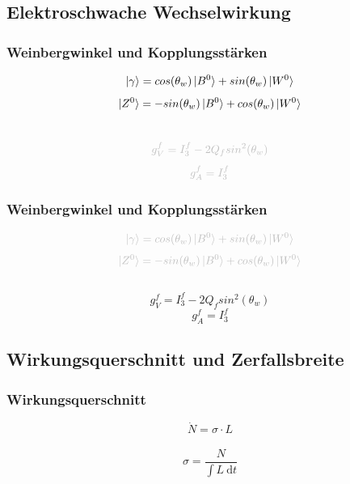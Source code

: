\subsection{Elektroschwache Wechselwirkung}
\begin{frame}
	\frametitle{Weinbergwinkel und Kopplungsstärken}
	\begin{center}
		\begin{equation*}
			\ket{\gamma} =  cos(\theta_w)\ket{B^0} + sin(\theta_w) \ket{W^0}
		\end{equation*}
		\begin{equation*}
		\ket{Z^0} = -sin(\theta_w) \ket{B^0} + cos(\theta_w) \ket{W^0}
		\end{equation*}\\
		\begin{equation*}
		\textcolor{lightgray}{g_V^f = I^f_3-2 Q_f sin^2(\theta_w)}
		\end{equation*}
		\begin{equation*}
		\textcolor{lightgray}{g_A^f = I^f_3}
		\end{equation*}
	\end{center}
\end{frame}
\begin{frame}
	\frametitle{Weinbergwinkel und Kopplungsstärken}
	\begin{center}
		\begin{equation*}
		\textcolor{lightgray}{\ket{\gamma} =  cos(\theta_w)\ket{B^0} + sin(\theta_w) \ket{W^0}}
		\end{equation*}
		\begin{equation*}
		\textcolor{lightgray}{\ket{Z^0} = -sin(\theta_w) \ket{B^0} + cos(\theta_w) \ket{W^0}}
		\end{equation*}
		\\
		\begin{equation*}
			g_V^f = I^f_3-2 Q_f sin^2(\theta_w)
		\end{equation*}
		\begin{equation*}
			g_A^f = I^f_3
		\end{equation*}
	\end{center}
\end{frame}
\subsection{Wirkungsquerschnitt und Zerfallsbreite}
\begin{frame}
	\frametitle{Wirkungsquerschnitt}
	\begin{center}
		\begin{equation*}
		\dot{N} = \sigma \cdot L
		\end{equation*}
		\\
		\begin{equation*}
		\sigma = \frac{N}{\int L~\text{d}t}
		\end{equation*}
	\end{center}
\end{frame}
